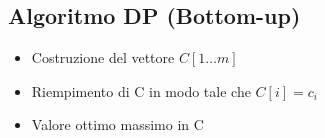 \subsection{Algoritmo DP (Bottom-up)}
\begin{itemize}
    \item Costruzione del vettore $C[1\dots m]$
    \item Riempimento di C in modo tale che $C[i]=c_i$
    \item Valore ottimo \ra massimo in C
\end{itemize}





